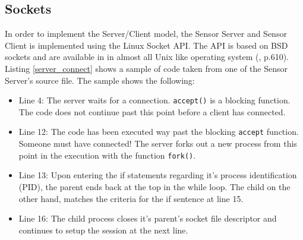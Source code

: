 \documentclass[12pt,english,a4paper]{report}
\begin{document}
\subsection{Sockets}\label{sockets}
In order to implement the Server/Client model, the Sensor Server and Sensor Client is implemented using the Linux Socket API. The API is based on BSD sockets and are available in in almost all Unix like operating system (\cite{LINUX_KERNEL}, p.610). Listing \ref{server_connect} shows a sample of code taken from one of the Sensor Server's source file. The sample shows the following:
\begin{itemize}
  \item Line 4: The server waits for a connection. \texttt{accept()} is a blocking function. The code does not continue past this point before a client has connected.  
  \item Line 12: The code has been executed way past the blocking \texttt{accept} function. Someone must have connected! The server forks out a new process from this point in the execution with the function \texttt{fork()}.
  \item Line 13: Upon entering the if statements regarding it's process identification (PID), the parent ends back at the top in the while loop. The child on the other hand, matches the criteria for the if sentence at line 15.
  \item Line 16: The child process closes it's parent's socket file descriptor and continues to setup the session at the next line.
\end{itemize}
\end{document}
